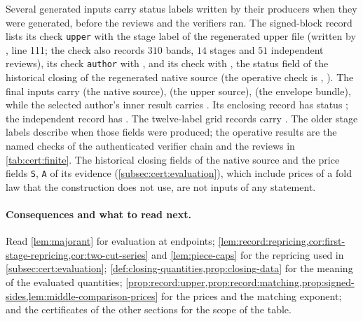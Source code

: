 \begin{remark}[Provenance]
Several generated inputs carry status labels written by their producers when
they were generated, before the reviews and the verifiers ran. The
signed-block record lists its check \texttt{upper} with the stage label
 of the regenerated
upper file (written by , line 111; the check
also records $310$ bands, $14$ stages and $51$ independent reviews), its check
\texttt{author} with , and its check
 with , the status field of the
historical closing of the regenerated native source (the operative check is
, ).
The final inputs carry 
(the native source), 
(the upper source), 
(the envelope bundle), while the selected author's inner result carries
. Its enclosing record
has status ; the independent record has
. The twelve-label grid records carry
. The older stage labels describe
when those fields were produced; the operative results are the named checks
of the authenticated verifier chain and the reviews in \cref{tab:cert:finite}. The historical
closing fields of the native source and the price fields \texttt{S},
\texttt{A} of its evidence (\cref{subsec:cert:evaluation}), which include
prices of a fold law that the construction does not use, are not inputs of
any statement.
\end{remark}

\paragraph{Consequences and what to read next.}
Read \cref{lem:majorant} for evaluation at endpoints;
\cref{lem:record:repricing,cor:first-stage-repricing,cor:two-cut-series} and
\cref{lem:piece-caps} for the repricing used in
\cref{subsec:cert:evaluation};
\cref{def:closing-quantities,prop:closing-data} for the meaning of the
evaluated quantities;
\cref{prop:record:upper,prop:record:matching,prop:signed-sides,lem:middle-comparison-prices}
for the prices and the matching exponent; and the certificates of
the other sections for the scope of the table.
